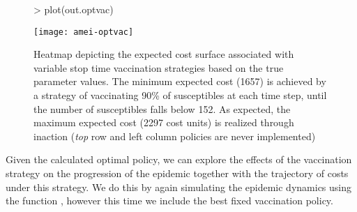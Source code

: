 \documentclass[shortnames,nojss]{jss}
\begin{document}
\begin{figure}[ht!]
\begin{Schunk}
\begin{Sinput}
> plot(out.optvac)
\end{Sinput}
\end{Schunk}
\centering \texttt{[image: amei-optvac]}
\caption{Heatmap depicting the expected cost surface associated with
  variable stop time vaccination strategies based on the true
  parameter values.  The minimum expected cost (1657) is
  achieved by a strategy of vaccinating 90\% of
  susceptibles at each time step, until the number of susceptibles
  falls below 152.  As expected, the maximum expected
  cost (2297 cost units) is realized through inaction
  ({\em top} row and left column policies are never implemented)}
\label{f:optvac} 
\end{figure} 
Given the calculated optimal policy, we can explore the effects of the
vaccination strategy on the progression of the epidemic together with
the trajectory of costs under this strategy. We do this by again
simulating the epidemic dynamics using the function ,
however this time we include the best fixed vaccination policy.
\end{document}
